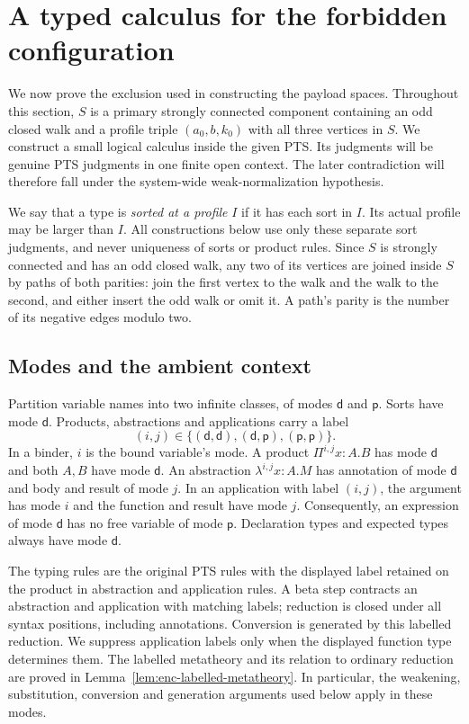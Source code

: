 \section{A typed calculus for the forbidden configuration}
\label{sec:enc-wrappers}

We now prove the exclusion used in constructing the payload spaces.  Throughout
this section, $S$ is a primary strongly connected component containing an odd
closed walk and a profile triple $(a_0,b,k_0)$ with all three vertices in $S$.
We construct a small logical calculus inside the given PTS.  Its judgments will
be genuine PTS judgments in one finite open context.  The later contradiction
will therefore fall under the system-wide weak-normalization hypothesis.

We say that a type is \emph{sorted at a profile} $I$ if it has each sort in $I$.
Its actual profile may be larger than $I$.  All constructions below use only
these separate sort judgments, and never uniqueness of sorts or product rules.
Since $S$ is strongly connected and has an odd closed walk, any two of its
vertices are joined inside $S$ by paths of both parities: join the first vertex
to the walk and the walk to the second, and either insert the odd walk or omit
it.  A path's parity is the number of its negative edges modulo two.

\subsection{Modes and the ambient context}
\label{subsec:enc-modes}

Partition variable names into two infinite classes, of modes $\mathsf d$
and $\mathsf p$.  Sorts have mode $\mathsf d$.  Products, abstractions and
applications carry a label
\[
 (i,j)\in\{(\mathsf d,\mathsf d),(\mathsf d,\mathsf p),
                 (\mathsf p,\mathsf p)\}.
\]
In a binder, $i$ is the bound variable's mode.  A product
$\Pi^{i,j}x:A.B$ has mode $\mathsf d$ and both $A,B$ have mode
$\mathsf d$.  An abstraction $\lambda^{i,j}x:A.M$ has annotation of mode
$\mathsf d$ and body and result of mode $j$.  In an application with label
$(i,j)$, the argument has mode $i$ and the function and result have mode $j$.
Consequently, an expression of mode $\mathsf d$ has no free variable of mode
$\mathsf p$.  Declaration types and expected types always have mode
$\mathsf d$.

The typing rules are the original PTS rules with the displayed label retained
on the product in abstraction and application rules.  A beta step contracts
an abstraction and application with matching labels; reduction is closed under
all syntax positions, including annotations.  Conversion is generated by this
labelled reduction.  We suppress application labels only when the displayed
function type determines them.  The labelled metatheory and its relation to
ordinary reduction are proved in Lemma~\ref{lem:enc-labelled-metatheory}.
In particular, the weakening, substitution, conversion and generation
arguments used below apply in these modes.

